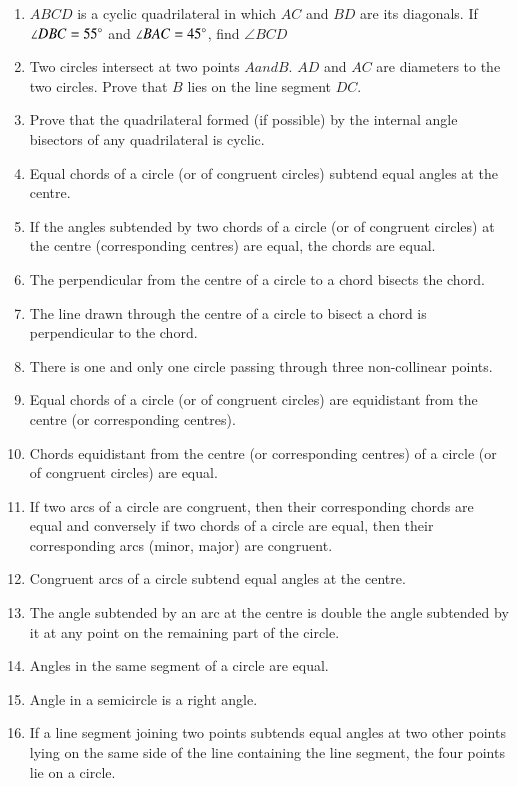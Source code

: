 \begin{enumerate}[label=\arabic*.,ref=\thesubsection.\theenumi]
\item $ABCD$ is a cyclic quadrilateral in which $AC$ and $BD$ are its diagonals. If $\angle DBC = 55\degree$ and $\angle BAC = 45\degree$, find $\angle BCD$
\item Two circles intersect at two points $A and B$. $AD$ and $AC$ are diameters to the two circles. Prove that $B$ lies on the line segment $DC$.
\item Prove that the quadrilateral formed (if possible) by the internal angle bisectors of any quadrilateral is cyclic.
\begin{enumerate}


\end{enumerate}

\item  Equal chords of a circle (or of congruent circles) subtend equal angles at the centre. 
\item  If the angles subtended by two chords of a circle (or of congruent circles) at the centre (corresponding centres) are equal, the chords are equal.
\item  The perpendicular from the centre of a circle to a chord bisects the chord. 
\item  The line drawn through the centre of a circle to bisect a chord is perpendicular to the chord.
\item  There is one and only one circle passing through three non-collinear points. 
\item  Equal chords of a circle (or of congruent circles) are equidistant from the centre (or corresponding centres).
\item Chords equidistant from the centre (or corresponding centres) of a circle (or of congruent circles) are equal.
\item  If two arcs of a circle are congruent, then their corresponding chords are equal and conversely if two chords of a circle are equal, then their corresponding arcs (minor, major) are congruent.
\item Congruent arcs of a circle subtend equal angles at the centre. 
\item  The angle subtended by an arc at the centre is double the angle subtended by it at any point on the remaining part of the circle.
\item Angles in the same segment of a circle are equal. \item  Angle in a semicircle is a right angle. 
\item  If a line segment joining two points subtends equal angles at two other points lying on the same side of the line containing the line segment, the four points lie on a circle. 

\end{enumerate}
